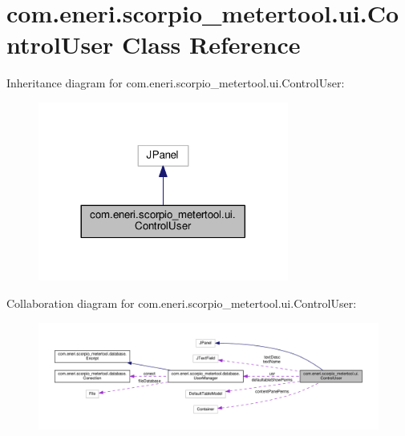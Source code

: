 \hypertarget{classcom_1_1eneri_1_1scorpio__metertool_1_1ui_1_1_control_user}{}\section{com.\+eneri.\+scorpio\+\_\+metertool.\+ui.\+Control\+User Class Reference}
\label{classcom_1_1eneri_1_1scorpio__metertool_1_1ui_1_1_control_user}


Inheritance diagram for com.\+eneri.\+scorpio\+\_\+metertool.\+ui.\+Control\+User\+:
\nopagebreak
\begin{figure}[H]
\begin{center}
\leavevmode
\includegraphics[width=233pt]{classcom_1_1eneri_1_1scorpio__metertool_1_1ui_1_1_control_user__inherit__graph}
\end{center}
\end{figure}


Collaboration diagram for com.\+eneri.\+scorpio\+\_\+metertool.\+ui.\+Control\+User\+:
\nopagebreak
\begin{figure}[H]
\begin{center}
\leavevmode
\includegraphics[width=350pt]{classcom_1_1eneri_1_1scorpio__metertool_1_1ui_1_1_control_user__coll__graph}
\end{center}
\end{figure}

